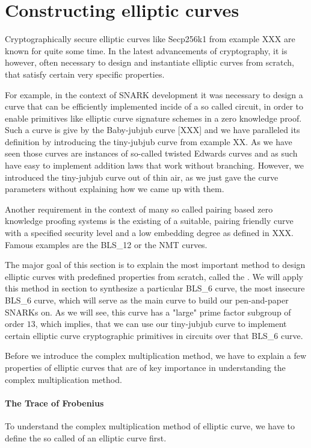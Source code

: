 \section{Constructing elliptic curves} Cryptographically secure elliptic curves like Secp256k1 from example XXX are known for quite some time. In the latest advancements of cryptography, it is however, often necessary to design and instantiate elliptic curves from scratch, that satisfy certain very specific properties. 

For example, in the context of SNARK development it was necessary to design a curve that can be efficiently implemented incide of a so called circuit, in order to enable primitives like elliptic curve signature schemes in a zero knowledge proof. Such a curve is give by the Baby-jubjub curve [XXX] and we have paralleled its definition by introducing the tiny-jubjub curve from example XX. As we have seen those curves are instances of so-called twisted Edwards curves and as such have easy to implement addition laws that work without branching. However, we introduced the tiny-jubjub curve out of thin air, as we just gave the curve parameters without explaining how we came up with them.

Another requirement in the context of many so called pairing based zero knowledge proofing systems is the existing of a suitable, pairing friendly curve with a specified security level and a low embedding degree as defined in XXX. Famous examples are the BLS\_12 or the NMT curves.

The major goal of this section is to explain the most important method to design elliptic curves with predefined properties from scratch, called the . We will apply this method in section to synthesize a particular BLS\_6 curve, the most insecure BLS\_6 curve, which will serve as the main curve to build our pen-and-paper SNARKs on. As we will see, this curve has a "large" prime factor subgroup of order $13$, which implies, that we can use our tiny-jubjub curve to implement certain elliptic curve cryptographic primitives in circuits over that BLS\_6 curve. 
 
Before we introduce the complex multiplication method, we have to explain a few properties of elliptic curves that are of key importance in understanding the complex multiplication method. 
\paragraph{The Trace of Frobenius} To understand the complex multiplication method of elliptic curve, we have to define the so called  of an elliptic curve first.

